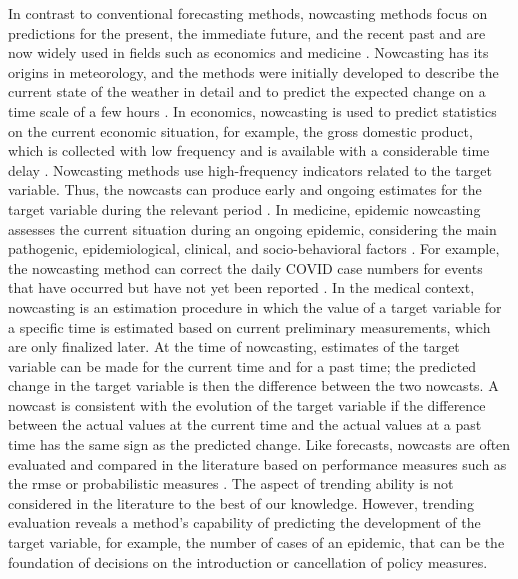 In contrast to conventional forecasting methods, nowcasting methods focus on predictions for the present, the immediate future, and the recent past \parencite{banbura2013now} and are now widely used in fields such as economics and medicine \parencite{bok2018macroeconomic, Wolffram2023}.
Nowcasting has its origins in meteorology, and the methods were initially developed to describe the current state of the weather in detail and to predict the expected change on a time scale of a few hours \parencite{browning1989nowcasting,schmid2019nowcasting}. 
In economics, nowcasting is used to predict statistics on the current economic situation, for example, the gross domestic product, which is collected with low frequency and is available with a considerable time delay \parencite{banbura2013now}.
Nowcasting methods use high-frequency indicators related to the target variable.
Thus, the nowcasts can produce early and ongoing estimates for the target variable during the relevant period \parencite{castle2017forecasting}. 
In medicine, epidemic nowcasting assesses the current situation during an ongoing epidemic, considering the main pathogenic, epidemiological, clinical, and socio-behavioral factors \parencite{wu2021nowcasting}. 
For example, the nowcasting method can correct the daily COVID case numbers for events that have occurred but have not yet been reported \parencite{gunther2021nowcasting}. 
In the medical context, nowcasting is an estimation procedure in which the value of a target variable for a specific time is estimated based on current preliminary measurements, which are only finalized later. 
At the time of nowcasting, estimates of the target variable can be made for the current time and for a past time; the predicted change in the target variable is then the difference between the two nowcasts. 
A nowcast is consistent with the evolution of the target variable if the difference between the actual values at the current time and the actual values at a past time has the same sign as the predicted change. 
Like forecasts, nowcasts are often evaluated and compared in the literature based on performance measures such as the \ac{rmse} \parencite{gunther2021nowcasting} or probabilistic measures \parencite{Wolffram2023}. 
The aspect of trending ability is not considered in the literature to the best of our knowledge. 
However, trending evaluation reveals a method's capability of predicting the development of the target variable, for example, the number of cases of an epidemic, that can be the foundation of decisions on the introduction or cancellation of policy measures. 

